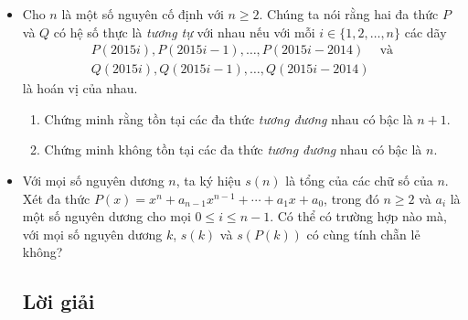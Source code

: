\documentclass[11pt]{scrartcl}
\begin{document}
\begin{itemize}[label=, leftmargin=0em, itemsep=-0em]
\begin{btvn}
        \end{btvn}
        \item \begin{btvn} Cho $n$ là một số nguyên cố định với $n \ge 2$. Chúng ta nói rằng hai đa thức $P$ và $Q$ có hệ số thực là \textit{tương tự} với nhau nếu với mỗi $i \in \{1, 2, \ldots, n\}$ các dãy
            \begin{eqnarray*}
                P(2015i), P(2015i - 1), \ldots, P(2015i - 2014) & \text{và}\\
                Q(2015i), Q(2015i - 1), \ldots, Q(2015i - 2014)
            \end{eqnarray*}
        là hoán vị của nhau.
        \begin{enumerate}[label=(\alph*)]
            \item Chứng minh rằng tồn tại các đa thức \textit{tương đương} nhau có bậc là $n + 1$.
            \item Chứng minh không tồn tại các đa thức \textit{tương đương} nhau có bậc là $n$.
        \end{enumerate}
        \end{btvn}
        \item \begin{btvn}
            Với mọi số nguyên dương \( n \), ta ký hiệu \( s(n) \) là tổng của các chữ số của \( n \). Xét đa thức \( P(x) = x^n + a_{n-1}x^{n-1} + \cdots + a_1x + a_0 \), trong đó \( n \geqslant 2 \) và \( a_i \) là một số nguyên dương cho mọi \( 0 \leqslant i \leqslant n-1 \). Có thể có trường hợp nào mà, với mọi số nguyên dương \( k \), \( s(k) \) và \( s(P(k)) \) có cùng tính chẵn lẻ không?

        \end{btvn}
        \subsection{\LARGE \textcolor{dk}{Lời giải}}
\end{itemize}
\end{document}
